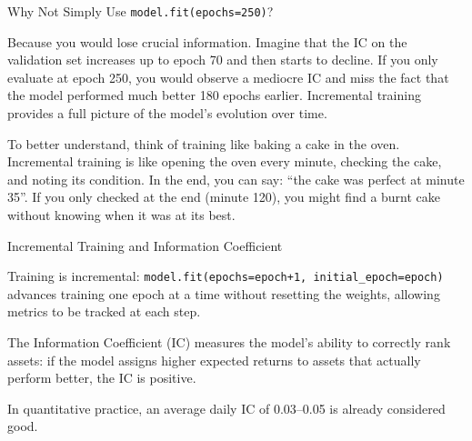 \documentclass[aspectratio=169, 11pt]{beamer}
\begin{document}
%
%
\begin{frame}{Why Not Simply Use \texttt{model.fit(epochs=250)}?}

Because you would lose crucial information. Imagine that the IC on the validation set increases up to epoch 70 and then starts to decline. If you only evaluate at epoch 250, you would observe a mediocre IC and miss the fact that the model performed much better 180 epochs earlier. Incremental training provides a full picture of the model’s evolution over time.

\vspace{0.3cm}

To better understand, think of training like baking a cake in the oven. Incremental training is like opening the oven every minute, checking the cake, and noting its condition. In the end, you can say: ``the cake was perfect at minute 35''. If you only checked at the end (minute 120), you might find a burnt cake without knowing when it was at its best.

\end{frame}
%
%
\begin{frame}{Incremental Training and Information Coefficient}

Training is incremental: \texttt{model.fit(epochs=epoch+1, initial\_epoch=epoch)} advances training one epoch at a time without resetting the weights, allowing metrics to be tracked at each step.

\vspace{0.3cm}

The Information Coefficient (IC) measures the model's ability to correctly rank assets: if the model assigns higher expected returns to assets that actually perform better, the IC is positive.

\vspace{0.3cm}

In quantitative practice, an average daily IC of 0.03--0.05 is already considered good.

\end{frame}
%
%
\end{document}
